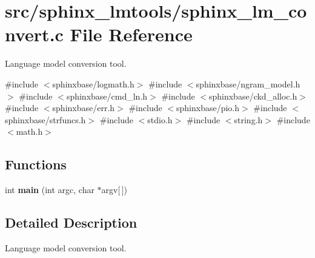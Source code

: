 \section{src/sphinx\+\_\+lmtools/sphinx\+\_\+lm\+\_\+convert.c File Reference}
\label{sphinx__lm__convert_8c}


Language model conversion tool.  


{\ttfamily \#include $<$sphinxbase/logmath.\+h$>$}\newline
{\ttfamily \#include $<$sphinxbase/ngram\+\_\+model.\+h$>$}\newline
{\ttfamily \#include $<$sphinxbase/cmd\+\_\+ln.\+h$>$}\newline
{\ttfamily \#include $<$sphinxbase/ckd\+\_\+alloc.\+h$>$}\newline
{\ttfamily \#include $<$sphinxbase/err.\+h$>$}\newline
{\ttfamily \#include $<$sphinxbase/pio.\+h$>$}\newline
{\ttfamily \#include $<$sphinxbase/strfuncs.\+h$>$}\newline
{\ttfamily \#include $<$stdio.\+h$>$}\newline
{\ttfamily \#include $<$string.\+h$>$}\newline
{\ttfamily \#include $<$math.\+h$>$}\newline
\subsection*{Functions}
\begin{DoxyCompactItemize}
\item 
\mbox{\label{sphinx__lm__convert_8c_a0ddf1224851353fc92bfbff6f499fa97}} 
int {\bfseries main} (int argc, char $\ast$argv[$\,$])
\end{DoxyCompactItemize}


\subsection{Detailed Description}
Language model conversion tool. 

